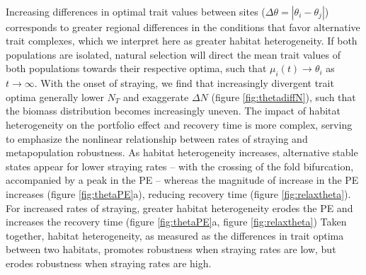 \documentclass[twocolumn,preprintnumbers,amsmath,amssymb,superscriptaddress]{revtex4}
\begin{document}
\\ 
\noindent Increasing differences in optimal trait values between sites ($\Delta\theta = \left|\theta_i - \theta_j\right|$) corresponds to greater regional differences in the conditions that favor alternative trait complexes, which we interpret here as greater habitat heterogeneity.
If both populations are isolated, natural selection will direct the mean trait values of both populations towards their respective optima, such that $\mu_i(t) \rightarrow \theta_i$ as $t\rightarrow\infty$.
With the onset of straying, we find that increasingly divergent trait optima generally lower $N_T$ and exaggerate $\Delta N$ (figure \ref{fig:thetadiffN}), such that the biomass distribution becomes increasingly uneven. %
The impact of habitat heterogeneity on the portfolio effect and recovery time is more complex, serving to emphasize the nonlinear relationship between rates of straying and metapopulation robustness. %
As habitat heterogeneity increases, alternative stable states appear for lower straying rates -- with the crossing of the fold bifurcation, accompanied by a peak in the PE -- whereas the magnitude of increase in the PE increases (figure \ref{fig:thetaPE}a), reducing recovery time (figure \ref{fig:relaxtheta}).
For increased rates of straying, greater habitat heterogeneity erodes the PE and increases the recovery time (figure \ref{fig:thetaPE}a, figure \ref{fig:relaxtheta})
Taken together, habitat heterogeneity, as measured as the differences in trait optima between two habitats, promotes robustness when straying rates are low, but erodes robustness when straying rates are high.
\\




\end{document}
